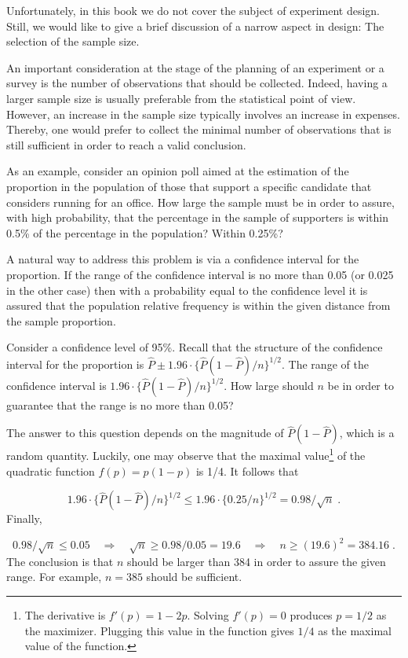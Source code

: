 \documentclass[]{krantz}
\theoremstyle{definition}
\theoremstyle{definition}
\theoremstyle{definition}
\theoremstyle{remark}
\begin{document}
Unfortunately, in this book we do not cover the subject of experiment
design. Still, we would like to give a brief discussion of a narrow
aspect in design: The selection of the sample size.

An important consideration at the stage of the planning of an experiment
or a survey is the number of observations that should be collected.
Indeed, having a larger sample size is usually preferable from the
statistical point of view. However, an increase in the sample size
typically involves an increase in expenses. Thereby, one would prefer to
collect the minimal number of observations that is still sufficient in
order to reach a valid conclusion.

As an example, consider an opinion poll aimed at the estimation of the
proportion in the population of those that support a specific candidate
that considers running for an office. How large the sample must be in
order to assure, with high probability, that the percentage in the
sample of supporters is within 0.5\% of the percentage in the
population? Within 0.25\%?

A natural way to address this problem is via a confidence interval for
the proportion. If the range of the confidence interval is no more than
0.05 (or 0.025 in the other case) then with a probability equal to the
confidence level it is assured that the population relative frequency is
within the given distance from the sample proportion.

Consider a confidence level of 95\%. Recall that the structure of the
confidence interval for the proportion is
\(\hat P \pm 1.96 \cdot \{\hat P (1-\hat P)/n\}^{1/2}\). The range of
the confidence interval is \(1.96 \cdot \{\hat P (1-\hat P)/n\}^{1/2}\).
How large should \(n\) be in order to guarantee that the range is no
more than 0.05?

The answer to this question depends on the magnitude of
\(\hat P (1-\hat P)\), which is a random quantity. Luckily, one may
observe that the maximal value\footnote{The derivative is
  \(f'(p) = 1-2p\). Solving \(f'(p)=0\) produces \(p=1/2\) as the
  maximizer. Plugging this value in the function gives \(1/4\) as the
  maximal value of the function.} of the quadratic function
\(f(p) = p (1-p)\) is 1/4. It follows that

\[1.96 \cdot \{\hat P (1-\hat P)/n\}^{1/2} \leq 1.96 \cdot \{0.25/n\}^{1/2} = 0.98/\sqrt{n}\;.\]
Finally,

\[0.98/\sqrt{n} \leq 0.05 \quad \Longrightarrow \quad \sqrt{n} \geq 0.98/0.05 = 19.6
\quad \Longrightarrow \quad  n \geq (19.6)^2 = 384.16\;.\] The
conclusion is that \(n\) should be larger than 384 in order to assure
the given range. For example, \(n=385\) should be sufficient.
\end{document}
